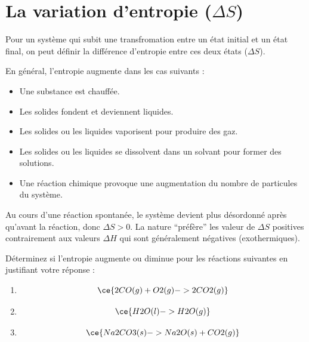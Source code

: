 \documentclass[
  11pt,
  a4paper,
  openany]{book}
\providecommand{\tightlist}{%
  \setlength{\itemsep}{0pt}\setlength{\parskip}{0pt}}
\begin{document}
\section{\texorpdfstring{La variation d'entropie (\(\Delta S\))}{La variation d'entropie (\textbackslash Delta S)}}\label{la-variation-dentropie-delta-s}

Pour un système qui subit une transfromation entre un état initial et un état final, on peut définir la différence d'entropie entre ces deux états (\(\Delta S\)).

En général, l'entropie augmente dans les cas suivants :

\begin{itemize}
\tightlist
\item
  Une substance est chauffée.
\item
  Les solides fondent et deviennent liquides.
\item
  Les solides ou les liquides vaporisent pour produire des gaz.
\item
  Les solides ou les liquides se dissolvent dans un solvant pour former des solutions.
\item
  Une réaction chimique provoque une augmentation du nombre de particules du système.
\end{itemize}

Au cours d'une réaction spontanée, le système devient plus désordonné après qu'avant la réaction, donc \(\Delta S > 0\). La nature ``préfère'' les valeur de \(\Delta S\) positives contrairement aux valeurs \(\Delta H\) qui sont généralement négatives (exothermiques).

\begin{Exercise}

Déterminez si l'entropie augmente ou diminue pour les réactions suivantes en justifiant votre réponse :

\begin{enumerate}
\def\labelenumi{\alph{enumi}.}
\tightlist
\item
  \[ \ce{2 CO(g) + O2(g) -> 2 CO2(g)} \]
\item
  \[ \ce{H2O(l) -> H2O(g)} \]
\item
  \[ \ce{Na2CO3(s) -> Na2O(s) +CO2(g)} \]
\end{enumerate}

\end{Exercise}
\end{document}
